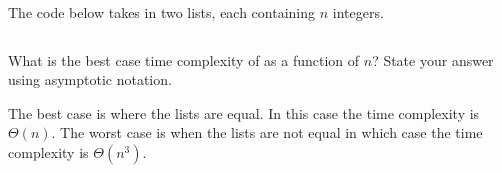 \Needspace{3.75in}
\begin{prob}

    The code below takes in two lists, each containing $n$ integers.

    \inputminted{python}{\thisdir/code.py}

    What is the best case time complexity of  as a function of $n$?
    State your answer using asymptotic notation.


    \begin{soln}
        The best case is where the lists are equal. In this case the time
        complexity is $\Theta(n)$. The worst case is when the lists are not
        equal in which case the time complexity is $\Theta(n^3)$.
    \end{soln}


\end{prob}
